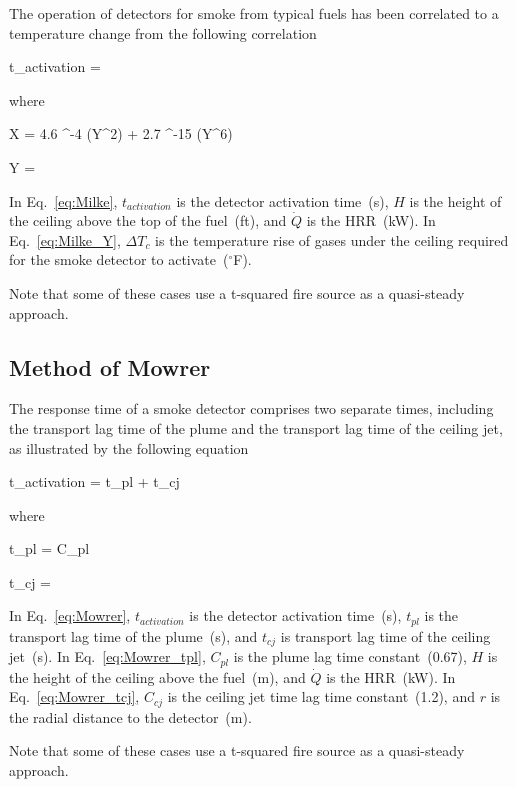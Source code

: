 The operation of detectors for smoke from typical fuels has been correlated to a temperature change from the following correlation

\be
t_{activation} = 
\label{eq:Milke}
\ee

\noindent where

\be
X = 4.6 ^{-4} (Y^2) + 2.7 ^{-15} (Y^6)
\label{eq:Milke_X}
\ee

\be
Y = 
\label{eq:Milke_Y}
\ee

In Eq.~\ref{eq:Milke}, $t_{activation}$ is the detector activation time~(s), $H$ is the height of the ceiling above the top of the fuel~(ft), and $\dot Q$ is the HRR~(kW). In Eq.~\ref{eq:Milke_Y}, $\Delta T_c$ is the temperature rise of gases under the ceiling required for the smoke detector to activate~($^\circ$F).

Note that some of these cases use a t-squared fire source as a quasi-steady approach.


\clearpage


\subsection{Method of Mowrer}

The response time of a smoke detector comprises two separate times, including the transport lag time of the plume and the transport lag time of the ceiling jet, as illustrated by the following equation

\be
t_{activation} = t_{pl} + t_{cj}
\label{eq:Mowrer}
\ee

\noindent where

\be
t_{pl} = C_{pl} 
\label{eq:Mowrer_tpl}
\ee

\be
t_{cj} =  
\label{eq:Mowrer_tcj}
\ee

In Eq.~\ref{eq:Mowrer}, $t_{activation}$ is the detector activation time~(s), $t_{pl}$ is the transport lag time of the plume~(s), and $t_{cj}$ is transport lag time of the ceiling jet~(s). In Eq.~\ref{eq:Mowrer_tpl}, $C_{pl}$ is the plume lag time constant~(0.67), $H$ is the height of the ceiling above the fuel~(m), and $\dot Q$ is the HRR~(kW). In Eq.~\ref{eq:Mowrer_tcj}, $C_{cj}$ is the ceiling jet time lag time constant~(1.2), and $r$ is the radial distance to the detector~(m).

Note that some of these cases use a t-squared fire source as a quasi-steady approach.



